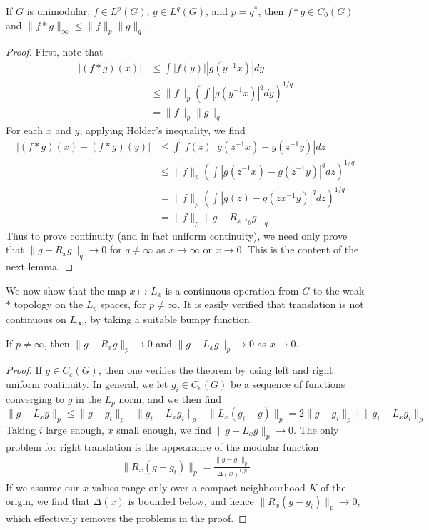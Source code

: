 \begin{theorem}
    If $G$ is unimodular, $f \in L^p(G)$, $g \in L^q(G)$, and $p = q^*$, then $f*g \in C_0(G)$ and $\| f * g \|_\infty \leq \| f \|_p \| g \|_q$.
\end{theorem}
\begin{proof}
    First, note that
    \begin{align*}
        |(f*g)(x)| &\leq \int |f(y)| |g(y^{-1}x)| dy\\
        &\leq \| f \|_p \left( \int |g(y^{-1}x)|^q dy \right)^{1/q}\\
        &= \| f \|_p \| g \|_q
    \end{align*}
    For each $x$ and $y$, applying H\"{o}lder's inequality, we find
    \begin{align*}
        |(f*g)(x) - (f*g)(y)| &\leq \int |f(z)| |g(z^{-1}x) - g(z^{-1}y)| dz\\
        &\leq \| f \|_p \left( \int |g(z^{-1}x) - g(z^{-1}y)|^q dz \right)^{1/q}\\
        &= \| f \|_p \left( \int |g(z) - g(zx^{-1}y)|^q dz \right)^{1/q}\\
        &= \| f \|_p \| g - R_{x^{-1}y} g \|_q
    \end{align*}
    Thus to prove continuity (and in fact uniform continuity), we need only prove that $\| g - R_x g \|_q \to 0$ for $q \neq \infty$ as $x \to \infty$ or $x \to 0$. This is the content of the next lemma.
\end{proof}

We now show that the map $x \mapsto L_x$ is a continuous operation from $G$ to the weak $*$ topology on the $L_p$ spaces, for $p \neq \infty$. It is easily verified that translation is not continuous on $L_\infty$, by taking a suitable bumpy function.

\begin{theorem}
    If $p \neq \infty$, then $\| g - R_x g \|_p \to 0$ and $\| g - L_x g \|_p \to 0$ as $x \to 0$.
\end{theorem}
\begin{proof}
    If $g \in C_c(G)$, then one verifies the theorem by using left and right uniform continuity. In general, we let $g_i \in C_c(G)$ be a sequence of functions converging to $g$ in the $L_p$ norm, and we then find
    \[ \| g - L_x g \|_p \leq \| g - g_i \|_p + \| g_i - L_x g_i \|_p + \| L_x (g_i - g) \|_p = 2 \| g - g_i \|_p + \| g_i - L_x g_i \|_p \]
    Taking $i$ large enough, $x$ small enough, we find $\| g - L_x g \|_p \to 0$. The only problem for right translation is the appearance of the modular function
    \begin{align*}
        \| R_x (g - g_i) \|_p = \frac{\| g - g_i \|_p}{\Delta(x)^{1/p}}
    \end{align*}
    If we assume our $x$ values range only over a compact neighbourhood $K$ of the origin, we find that $\Delta(x)$ is bounded below, and hence $\| R_x (g - g_i) \|_p \to 0$, which effectively removes the problems in the proof.
\end{proof}


